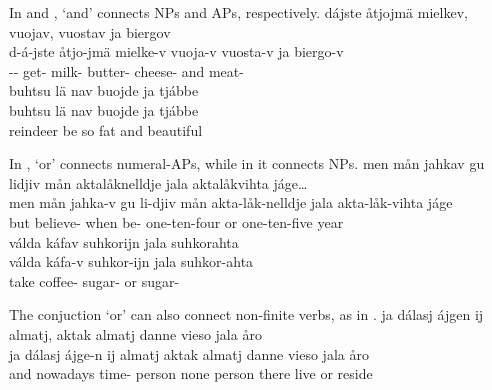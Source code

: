 In  and ,  ‘and’ connects NPs and APs, respectively. 
\ea\label{conjunctionEx1}%
\glll	dájste åtjojmä mielkev, vuojav, vuostav ja biergov\\
	d-á-jste åtjo-jmä mielke-v vuoja-v vuosta-v ja biergo-v\\
	-- get- milk- butter- cheese- and meat-\\\nopagebreak
{}	
\z
\ea\label{conjunctionEx2}%
\glll	buhtsu lä nav buojde ja tjábbe\\
	buhtsu lä nav buojde ja tjábbe\\
	reindeer\BS{} be\BS{} so fat\BS{} and beautiful\BS{} \\\nopagebreak
{}	
\z

In ,  ‘or’ connects numeral-APs, while in  it connects NPs. 
\ea\label{conjunctionEx3}%
\glll	men mån jahkav gu lidjiv mån aktalåknelldje jala aktalåkvihta jáge…\\
	men mån jahka-v gu li-djiv mån akta-låk-nelldje jala akta-låk-vihta jáge\\
	but  believe- when be-  one-ten-four or one-ten-five year\BS{}\\\nopagebreak
{}	
\z
\ea\label{conjunctionEx4}%
\glll	válda káfav suhkorijn jala suhkorahta\\
	válda káfa-v suhkor-ijn jala suhkor-ahta\\
	take\BS{} coffee- sugar- or sugar-\\\nopagebreak
{}	
\z

The conjuction  ‘or’ can also connect non-finite verbs, as in . 
\ea\label{conjunctionEx5}%
\glll	ja dálasj ájgen ij almatj, aktak almatj danne vieso jala åro\\
	ja dálasj ájge-n ij almatj aktak almatj danne vieso jala åro\\
	and nowadays time- \BS{} person\BS{} none person\BS{} there live\BS{} or reside\BS{}\\\nopagebreak
{}	
\z

